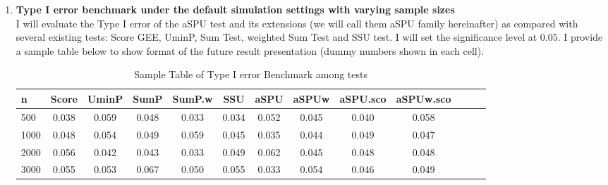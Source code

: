 \documentclass[12pt]{article}
\begin{document}
\begin{enumerate}
\item \textbf{Type I error benchmark under the default simulation settings with varying sample sizes}\\
I will evaluate the Type I error of the aSPU test and its extensions (we will call them aSPU family hereinafter) as compared with several existing tests: Score GEE, UminP, Sum Test, weighted Sum Test and SSU test. I will set the significance level at $0.05$. I provide a sample table below to show format of the future result presentation (dummy numbers shown in each cell).
\begin{center}
\small
\begin{table}[H]
\begin{tabular}{lcccccccccccc}
\hline 
n & Score & UminP & SumP & SumP.w & SSU & aSPU & aSPUw & aSPU.sco & aSPUw.sco \\ 
\hline 
500 & 0.038 & 0.059 & 0.048 & 0.033 & 0.034 & 0.052 & 0.045 & 0.040 & 0.058 \\ 
1000 & 0.048 & 0.054 & 0.049 & 0.059 & 0.045 & 0.035 & 0.044 & 0.049 & 0.047 \\ 
2000 & 0.056 & 0.042 & 0.043 & 0.033 & 0.049 & 0.062 & 0.045 & 0.048 & 0.048 \\ 
3000 & 0.055 & 0.053 & 0.067 & 0.050 & 0.055 & 0.033 & 0.054 & 0.046 & 0.049 \\ 
\hline 
\end{tabular}
\caption{Sample Table of Type I error Benchmark among tests}
\label{table:type_I_error_CV_varySampleSize}
\end{table}
\end{center}



\end{enumerate}
\end{document}
